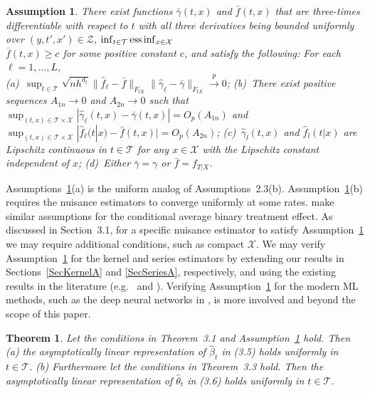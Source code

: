 \documentclass[lettersize, 12pt]{article}
\newtheorem{theorem}{Theorem}
\newtheorem{assumption}{Assumption}
\begin{document}
{\begin{assumption}
There exist functions $\bar \gamma(t,x)$ and $\bar f(t,x)$ that 
are three-times differentiable with respect to $t$ with all
three derivatives being bounded uniformly over $(y,t',x') \in\mathcal{Z}$,
$\inf_{t\in\mathcal{T}}{\rm ess}\inf_{x\in\mathcal{X}}
$\\$ \bar f(t,x) \geq c$ for some positive constant $c$, and satisfy the following: 
For each $\ell= 1,...,L$,\\
(a)~$\sup_{t\in\mathcal{T}} \sqrt{nh^{d_t}} 
 \big\| \hat f_\ell - \bar f \big\|_{F_{tX}}
\big\| \hat\gamma_\ell - \bar\gamma\big\|_{F_{tX}}
\stackrel{p}{\rightarrow}0$;
(b)~There exist positive sequences $A_{1n}\rightarrow 0$ and $A_{2n}\rightarrow 0$ such that 
$\sup_{(t,x)\in\mathcal{T}\times\mathcal{X}}| \hat\gamma_\ell(t,x) - \bar\gamma(t,x) | = O_p(A_{1n})$ and 
$\sup_{(t,x)\in\mathcal{T}\times\mathcal{X}}| \hat f_\ell(t|x) - \bar f(t,x) | = O_p(A_{2n})$;
(c)~$\hat \gamma_l(t,x)$ and $\hat f_l(t|x)$ are Lipschitz continuous in $t \in \mathcal{T}$ for any $x\in\mathcal{X}$ with the Lipschitz constant independent of  $x$;
(d)~Either $\bar \gamma = \gamma$ or $\bar{f} = f_{T|X}$.
\label{Aunif}
\end{assumption}
Assumptions~\ref{Aunif}(a) is the uniform analog of Assumptions~2.3(b).
Assumption~\ref{Aunif}(b) requires the nuisance estimators to converge uniformly at some rates.
\cite{Fan} make similar assumptions for the conditional average binary treatment effect.
As discussed in Section~3.1, for a specific nuisance estimator to satisfy Assumption~\ref{Aunif}
we may require additional conditions, such as compact $\mathcal{X}$.
We may verify Assumption~\ref{Aunif} for the kernel and series estimators by extending our results in Sections~\ref{SecKernelA} and \ref{SecSeriesA}, respectively,
and using the existing results in the literature (e.g.\ \cite{Newey94ET} and \cite{CFF20AS}).
Verifying Assumption~\ref{Aunif} for the modern ML methods, such as the deep neural networks in \cite{Farrell18}, is more involved and beyond the scope of this paper. 

\begin{theorem}
Let the conditions in Theorem~3.1 and Assumption~\ref{Aunif} hold. 
Then (a) the asymptotically linear representation of $\hat \beta_t$ in (3.5) holds uniformly in $t \in \mathcal{T}$.
(b) Furthermore let the conditions in Theorem~3.3 hold.  
Then the asymptotically linear representation of $\hat \theta_t$ in (3.6) holds uniformly in $t \in \mathcal{T}$.
\label{TIFunif}
\end{theorem}

}
\end{document}
